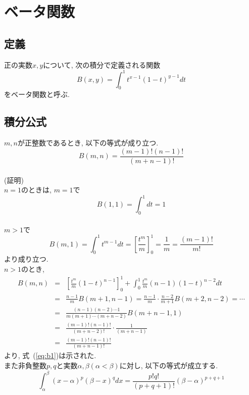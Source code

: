 \documentclass[a4paper,12pt,uplatex,dvipdfmx]{jsarticle}
\begin{document}
\section{ベータ関数}
\subsection{定義}
正の実数$x, y$について, 次の積分で定義される関数
\[
    B(x, y) = \int_0^1 t^{x-1}(1-t)^{y-1} dt
\]
をベータ関数と呼ぶ. \\

\subsection{積分公式}
$m, n$が正整数であるとき, 以下の等式が成り立つ.
\begin{equation}
    B(m, n) = \frac{(m-1)!(n-1)!}{(m+n-1)!}
    \label{eq:b1}
\end{equation} \\

(証明) \\
$n = 1$のときは, $m = 1$で
\[
    B(1, 1) = \int_0^1 dt = 1
\] \\
$m > 1$で
\[
    B(m, 1) = \int_0^1 t^{m-1} dt = \left[\frac{t^m}{m}\right]_0^1 = \frac{1}{m} = \frac{(m-1)!}{m!}
\]
より成り立つ. \\
$n > 1$のとき, 
\begin{eqnarray*}
    B(m, n) & = & \left[\frac{t^m}{m}(1-t)^{n-1}\right]_0^1 + \int_0^1 \frac{t^m}{m}(n-1)(1-t)^{n-2} dt \\
    & = & \frac{n-1}{m}B(m+1, n-1)
    = \frac{n-1}{m}\cdot\frac{n-2}{m+1}B(m+2, n-2) = \cdots \\
    & = & \frac{(n-1)(n-2)\cdots 1}{m(m+1)\cdots(m+n-2)}B(m+n-1, 1) \\
    & = & \frac{(m-1)!(n-1)!}{(m+n-2)!}\cdot\frac{1}{(m+n-1)}\\
    & = & \frac{(m-1)!(n-1)!}{(m+n-1)!}
\end{eqnarray*}
より, 式~(\ref{eq:b1})は示された. \\

また非負整数$p, q$と実数$\alpha, \beta(\alpha < \beta)$に対し, 以下の等式が成立する.
\begin{equation}
    \int_{\alpha}^{\beta}(x-\alpha)^{p}(\beta-x)^{q} dx = \frac{p!q!}{(p+q+1)!}(\beta-\alpha)^{p+q+1}
    \label{eq:b2}
\end{equation} \\
\end{document}
